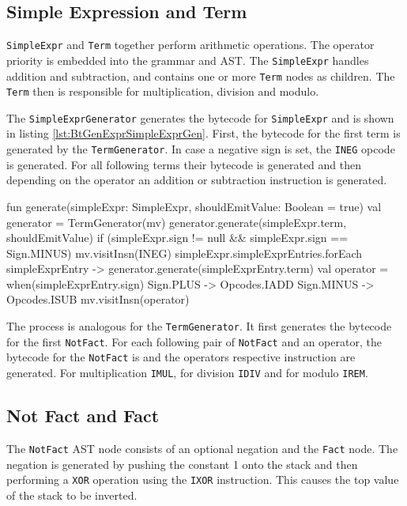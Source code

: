 \subsection{Simple Expression and Term}

\verb|SimpleExpr| and \verb|Term| together perform arithmetic operations. The operator priority is embedded into the grammar and AST. The \verb|SimpleExpr| handles addition and subtraction, and contains one or more \verb|Term| nodes as children. The \verb|Term| then is responsible for multiplication, division and modulo. 

The \verb|SimpleExprGenerator| generates the bytecode for \verb|SimpleExpr| and is shown in listing \ref{lst:BtGenExprSimpleExprGen}. First, the bytecode for the first term is generated by the \verb|TermGenerator|. In case a negative sign is set, the \verb|INEG| opcode is generated. For all following terms their bytecode is generated and then depending on the operator an addition or subtraction instruction is generated.   

\begin{KotlinCode}[float,numbers=none,caption=Implementation of the \texttt{generate} method of the \texttt{SimpleExprGenerator}., label=lst:BtGenExprSimpleExprGen]
fun generate(simpleExpr: SimpleExpr, shouldEmitValue: Boolean = true) {
    val generator = TermGenerator(mv)
    generator.generate(simpleExpr.term, shouldEmitValue)
    if (simpleExpr.sign != null && simpleExpr.sign == Sign.MINUS) {
        mv.visitInsn(INEG)
    }
    simpleExpr.simpleExprEntries.forEach { simpleExprEntry ->
        generator.generate(simpleExprEntry.term)
        val operator = when(simpleExprEntry.sign) {
            Sign.PLUS -> Opcodes.IADD
            Sign.MINUS -> Opcodes.ISUB
        }
        mv.visitInsn(operator)
    }
}
\end{KotlinCode}

The process is analogous for the \verb|TermGenerator|. It first generates the bytecode for the first \verb|NotFact|. For each following pair of \verb|NotFact| and an operator, the bytecode for the \verb|NotFact| is and the operators respective instruction are generated. For multiplication \verb|IMUL|, for division \verb|IDIV| and for modulo \verb|IREM|.

\subsection{Not Fact and Fact}

The \verb|NotFact| AST node consists of an optional negation and the \verb|Fact| node. The negation is generated by pushing the constant 1 onto the stack and then performing a \verb|XOR| operation using the \verb|IXOR| instruction. This causes the top value of the stack to be inverted. 

